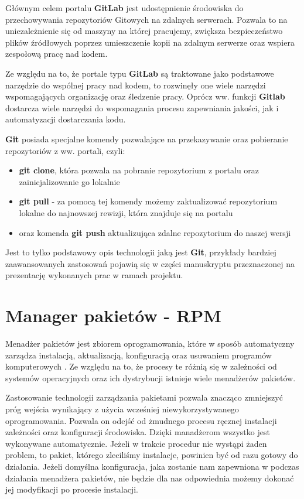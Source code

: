 Głównym celem portalu \textbf{GitLab} jest udostępnienie środowiska do przechowywania repozytoriów Gitowych na zdalnych serwerach. Pozwala to na uniezależnienie się od maszyny na której pracujemy, zwiększa bezpieczeństwo plików źródłowych poprzez umieszczenie kopii na zdalnym serwerze oraz wspiera zespołową pracę nad kodem.\par

Ze względu na to, że portale typu \textbf{GitLab} są traktowane jako podstawowe narzędzie do wspólnej pracy nad kodem, to rozwinęły one wiele narzędzi wspomagających organizację oraz śledzenie pracy. Oprócz ww. funkcji \textbf{Gitlab} dostarcza wiele narzędzi do wspomagania procesu zapewniania jakości, jak i automatyzacji dostarczania kodu.\par

\textbf{Git} posiada specjalne komendy pozwalające na przekazywanie oraz pobieranie repozytoriów z ww. portali, czyli:
\begin{itemize}
\item \textbf{git clone}, która pozwala na pobranie repozytorium z portalu oraz zainicjalizowanie go lokalnie
\item \textbf{git pull} - za pomocą tej komendy możemy zaktualizować repozytorium lokalne do najnowszej rewizji, która znajduje się na portalu
\item oraz komenda \textbf{git push} aktualizująca zdalne repozytorium do naszej wersji
\end{itemize}

Jest to tylko podstawowy opis technologii jaką jest \textbf{Git}, przykłady bardziej zaawansowanych zastosowań pojawią się w części manuskryptu przeznaczonej na prezentację wykonanych prac w ramach projektu.


\section{Manager pakietów - RPM}
Menadżer pakietów jest zbiorem oprogramowania, które w sposób automatyczny zarządza instalacją, aktualizacją, konfiguracją oraz usuwaniem programów komputerowych \cite{ManagerWiki}. Ze względu na to, że procesy te różnią się w zależności od systemów operacyjnych oraz ich dystrybucji istnieje wiele menadżerów pakietów.\par

Zastosowanie technologii zarządzania pakietami pozwala znacząco zmniejszyć próg wejścia wynikający z użycia wcześniej niewykorzystywanego oprogramowania. Pozwala on odejść od żmudnego procesu ręcznej instalacji zależności oraz konfiguracji środowiska. Dzięki manadżerom wszystko jest wykonywane automatycznie. Jeżeli w trakcie procedur nie wystąpi żaden problem, to pakiet, którego zleciliśmy instalacje, powinien być od razu gotowy do działania. Jeżeli domyślna konfiguracja, jaka zostanie nam zapewniona w podczas działania menadżera pakietów, nie będzie dla nas odpowiednia możemy dokonać jej modyfikacji po procesie instalacji.

